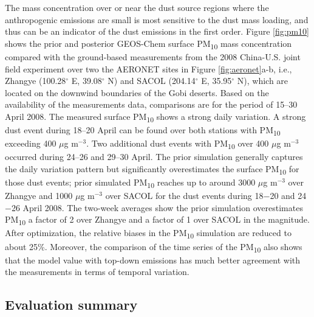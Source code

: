  The mass concentration over or near the dust source regions
 where the anthropogenic emissions are small is most sensitive to the dust mass loading,
 and thus can be an indicator of the dust emissions in the first order.
 Figure \ref{fig:pm10} shows the prior and posterior GEOS-Chem surface
 PM\textsubscript{10} mass concentration compared with the ground-based measurements
 from the 2008 China-U.S. joint field experiment \citep{ge10,huang10} over two the AERONET sites
 in Figure \ref{fig:aeronet}a-b, i.e., Zhangye (100.28$^{\circ}$ E, 39.08$^{\circ}$ N)
 and SACOL (204.14$^{\circ}$ E, 35.95$^{\circ}$ N), which are located
 on the downwind boundaries of the Gobi deserts.
 Based on the availability of the measurements data, comparisons are for the period of 15--30 April 2008.
 The measured surface PM\textsubscript{10} shows a strong daily variation.
 A strong dust event during 18--20 April can be found over both stations with
 PM\textsubscript{10} exceeding 400 $\mu$g m$^{-3}$.
 Two additional dust events with PM\textsubscript{10} over 400 $\mu$g m$^{-3}$ occurred during
 24--26 and 29--30 April.
 The prior simulation generally captures the daily variation pattern
 but significantly overestimates the surface PM\textsubscript{10} for those dust events;
 prior simulated PM\textsubscript{10} reaches up to around 3000 $\mu$g m$^{-3}$ over Zhangye
 and 1000 $\mu$g m$^{-3}$ over SACOL for the dust events during 18$-$20 and 24$-$26 April 2008.
 The two-week averages show the prior simulation overestimates PM\textsubscript{10}
 a factor of 2 over Zhangye and a factor of 1 over SACOL in the magnitude.
 After optimization, the relative biases in the PM\textsubscript{10} simulation are reduced to about 25\%.
 Moreover, the comparison of the time series of the PM\textsubscript{10} also shows that
 the model value with top-down emissions has much better agreement
 with the measurements in terms of temporal variation.

 \subsection{Evaluation summary}

